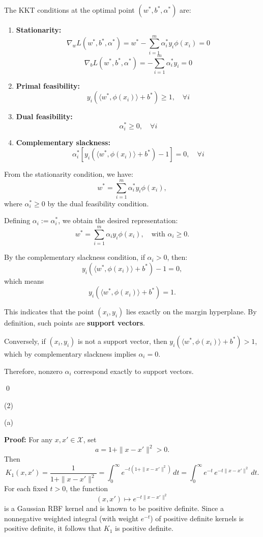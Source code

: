 \documentclass[letterpaper, 11pt]{article}
\newcommand{\1}{\mathds{1}}	%
\theoremstyle{definition}
\begin{document}
The KKT conditions at the optimal point $(w^*, b^*, \alpha^*)$ are:

\begin{enumerate}
\item \textbf{Stationarity:}
\[
\nabla_w L(w^*, b^*, \alpha^*) = w^* - \sum_{i=1}^m \alpha_i^* y_i \phi(x_i) = 0
\]
\[
\nabla_b L(w^*, b^*, \alpha^*) = -\sum_{i=1}^m \alpha_i^* y_i = 0
\]

\item \textbf{Primal feasibility:}
\[
y_i(\langle w^*, \phi(x_i) \rangle + b^*) \geq 1, \quad \forall i
\]

\item \textbf{Dual feasibility:}
\[
\alpha_i^* \geq 0, \quad \forall i
\]

\item \textbf{Complementary slackness:}
\[
\alpha_i^* [y_i(\langle w^*, \phi(x_i) \rangle + b^*) - 1] = 0, \quad \forall i
\]
\end{enumerate}

From the stationarity condition, we have:
\[
w^* = \sum_{i=1}^m \alpha_i^* y_i \phi(x_i),
\]
where $\alpha_i^* \geq 0$ by the dual feasibility condition.

Defining $\alpha_i := \alpha_i^*$, we obtain the desired representation:
\[
w^* = \sum_{i=1}^m \alpha_i y_i \phi(x_i), \quad \text{with } \alpha_i \geq 0.
\]

By the complementary slackness condition, if $\alpha_i > 0$, then:
\[
y_i(\langle w^*, \phi(x_i) \rangle + b^*) - 1 = 0,
\]
which means
\[
y_i(\langle w^*, \phi(x_i) \rangle + b^*) = 1.
\]

This indicates that the point $(x_i, y_i)$ lies exactly on the margin hyperplane. By definition, such points are \textbf{support vectors}.

Conversely, if $(x_i, y_i)$ is not a support vector, then $y_i(\langle w^*, \phi(x_i) \rangle + b^*) > 1$, which by complementary slackness implies $\alpha_i = 0$.

Therefore, nonzero $\alpha_i$ correspond exactly to support vectors.

\qed

(2)

(a) 

\textbf{Proof:}  
For any $x,x'\in\mathcal{X}$, set
\[
a = 1+\|x-x'\|^2 > 0.
\]
Then
\[
K_1(x,x') = \frac{1}{1+\|x-x'\|^2} = \int_0^\infty e^{-t(1+\|x-x'\|^2)}\,dt = \int_0^\infty e^{-t} \, e^{-t\|x-x'\|^2}\,dt.
\]
For each fixed $t>0$, the function
\[
(x,x') \mapsto e^{-t\|x-x'\|^2}
\]
is a Gaussian RBF kernel and is known to be positive definite. Since a nonnegative weighted integral (with weight $e^{-t}$) of positive definite kernels is positive definite, it follows that $K_1$ is positive definite.
\end{document}
